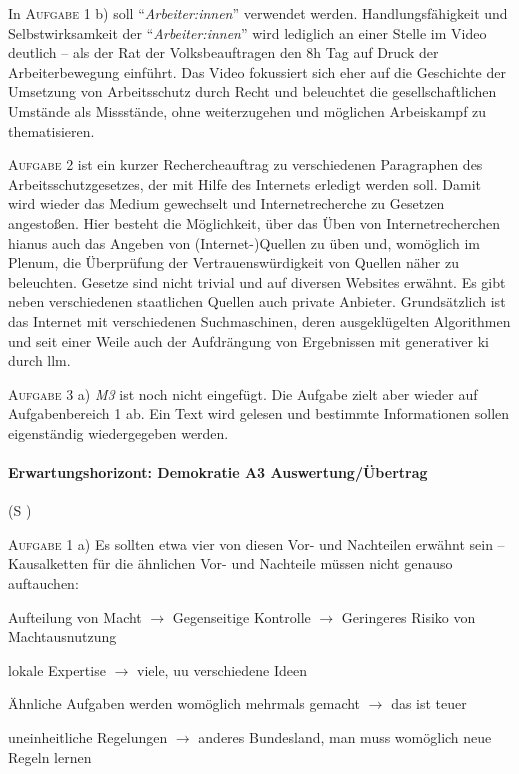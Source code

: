 In \textsc{Aufgabe 1} b) soll \enquote{\emph{Arbeiter:innen}} verwendet werden. Handlungsfähigkeit und Selbstwirksamkeit der \enquote{\emph{Arbeiter:innen}} wird lediglich an einer Stelle im Video deutlich -- als der Rat der Volksbeauftragen den 8h Tag auf Druck der Arbeiterbewegung einführt. Das Video fokussiert sich eher auf die Geschichte der Umsetzung von Arbeitsschutz durch Recht und beleuchtet die gesellschaftlichen Umstände als Missstände, ohne weiterzugehen und möglichen Arbeiskampf zu thematisieren. %

\textsc{Aufgabe 2} ist ein kurzer Rechercheauftrag zu verschiedenen Paragraphen des Arbeitsschutzgesetzes, der mit Hilfe des Internets erledigt werden soll. Damit wird wieder das Medium gewechselt und Internetrecherche zu Gesetzen angestoßen. 
Hier besteht die Möglichkeit, über das Üben von Internetrecherchen hianus auch das Angeben von (Internet-)Quellen zu üben und, womöglich im Plenum, die Überprüfung der Vertrauenswürdigkeit von Quellen näher zu beleuchten. Gesetze sind nicht trivial und auf diversen Websites erwähnt. Es gibt neben verschiedenen staatlichen Quellen auch private Anbieter. Grundsätzlich ist das Internet mit verschiedenen Suchmaschinen, deren ausgeklügelten Algorithmen und seit einer Weile auch der Aufdrängung von Ergebnissen mit generativer \gls{ki} durch \gls{llm}.

\textsc{Aufgabe 3} a) \emph{M3} ist noch nicht eingefügt. Die Aufgabe zielt aber wieder auf Aufgabenbereich 1 ab. Ein Text wird gelesen und bestimmte Informationen sollen eigenständig wiedergegeben werden. 



\paragraph{Erwartungshorizont: Demokratie A3 Auswertung/Übertrag} (\gls{S} \pageref{DEMOKRATIE-A3})

\textsc{Aufgabe 1} a) \quad
Es sollten etwa vier von diesen Vor- und Nachteilen erwähnt sein -- Kausalketten für die ähnlichen Vor- und Nachteile müssen nicht genauso auftauchen:
 \begin{myitemize}
    \item Aufteilung von Macht $\rightarrow$ Gegenseitige Kontrolle $\rightarrow$ Geringeres Risiko von Machtausnutzung
    \item lokale Expertise $\rightarrow$ viele, \gls{uu} verschiedene Ideen
    \item Ähnliche Aufgaben werden womöglich mehrmals gemacht $\rightarrow$ das ist teuer
    \item uneinheitliche Regelungen $\rightarrow$ anderes Bundesland, man muss womöglich neue Regeln lernen
 \end{myitemize}


